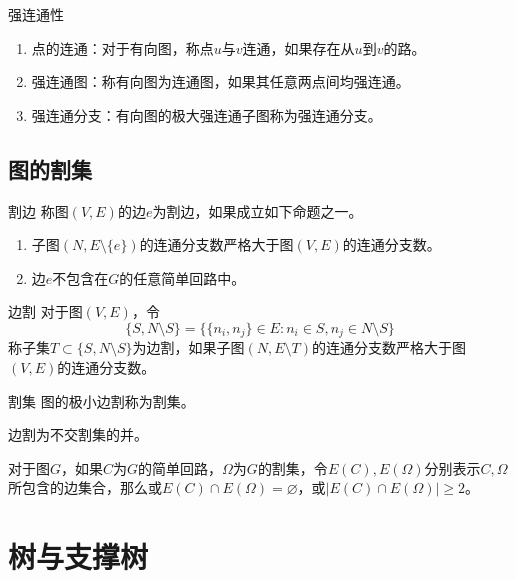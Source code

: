 \documentclass[lang = cn, scheme = chinese, thmcnt = section]{elegantbook}
\newcommand{\sub}{\subset}             %
\begin{document}
\begin{definition}{强连通性}
	\begin{enumerate}
		\item 点的连通：对于有向图，称点$u$与$v$连通，如果存在从$u$到$v$的路。
		\item 强连通图：称有向图为连通图，如果其任意两点间均强连通。
		\item 强连通分支：有向图的极大强连通子图称为强连通分支。
	\end{enumerate}
\end{definition}

\subsection{图的割集}

\begin{definition}{割边}
	称图$(V,E)$的边$e$为割边，如果成立如下命题之一。
	\begin{enumerate}
		\item 子图$(N,E\setminus\{e\})$的连通分支数严格大于图$(V,E)$的连通分支数。
		\item 边$e$不包含在$G$的任意简单回路中。
	\end{enumerate}
\end{definition}

\begin{definition}{边割}
	对于图$(V,E)$，令
	$$
	\{ S,N\setminus S \}=\{ \{n_i,n_j\}\in E:n_i\in S,n_j\in N\setminus S \}
	$$
	称子集$T\sub \{ S,N\setminus S \}$为边割，如果子图$(N,E\setminus T)$的连通分支数严格大于图$(V,E)$的连通分支数。
\end{definition}

\begin{definition}{割集}
	图的极小边割称为割集。
\end{definition}

\begin{theorem}
	边割为不交割集的并。
\end{theorem}

\begin{theorem}
	对于图$G$，如果$C$为$G$的简单回路，$\Omega$为$G$的割集，令$E(C),E(\Omega)$分别表示$C,\Omega$所包含的边集合，那么或$E(C)\cap E(\Omega)=\varnothing$，或$|E(C)\cap E(\Omega)|\ge2$。
\end{theorem}

\section{树与支撑树}
\end{document}
